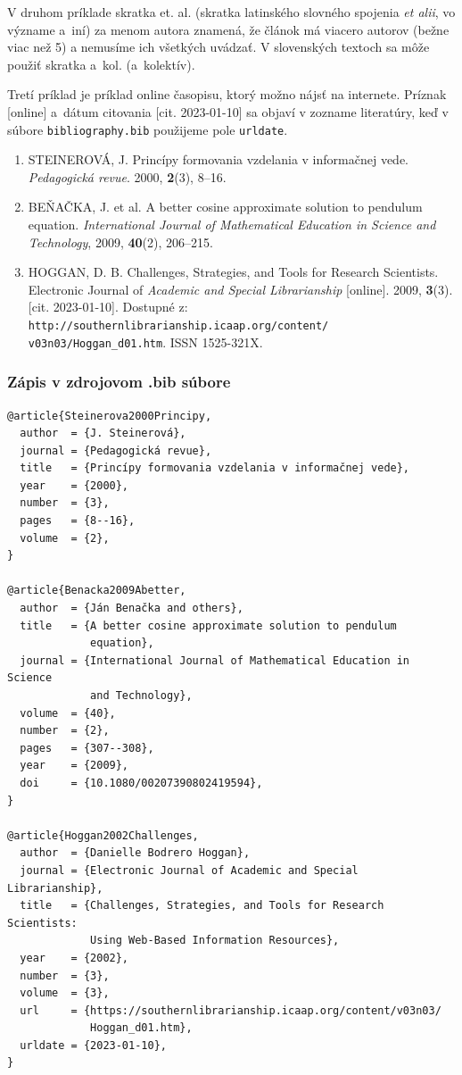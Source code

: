 \documentclass[../../../thesis.tex]{subfiles}
\begin{document}
V druhom príklade skratka et. al. (skratka latinského slovného spojenia \textit{et alii}, vo význame a~iní) za menom autora znamená, že článok má viacero autorov (bežne viac než 5) a nemusíme ich všetkých uvádzať.
V slovenských textoch sa môže použiť skratka a~kol. (a~kolektív).

Tretí príklad je príklad online časopisu, ktorý možno nájsť na internete. Príznak [online] a~dátum citovania [cit. 2023-01-10] sa objaví v zozname literatúry, keď v súbore \verb|bibliography.bib| použijeme pole \verb|urldate|.

\begin{enumerate}
\item STEINEROVÁ, J. Princípy formovania vzdelania v informačnej vede. \textit{Pedagogická revue}. 2000, \textbf{2}(3), 8–16.
\item BEŇAČKA, J. et al. A better cosine approximate solution to pendulum equation. \textit{International Journal of Mathematical Education in Science and Technology}, 2009, \textbf{40}(2), 206–215.
\item HOGGAN, D. B. Challenges, Strategies, and Tools for Research Scientists. Electronic Journal of \textit{Academic and Special Librarianship} [online]. 2009, \textbf{3}(3). [cit. 2023-01-10]. Dostupné z: \texttt{http://southernlibrarianship.icaap.org/content/ v03n03/Hoggan\_d01.htm}. ISSN 1525-321X.
\end{enumerate}

\subsubsection*{\normalsize Zápis v zdrojovom .bib súbore}
\begin{verbatim}
@article{Steinerova2000Principy,
  author  = {J. Steinerová},
  journal = {Pedagogická revue},
  title   = {Princípy formovania vzdelania v informačnej vede},
  year    = {2000},
  number  = {3},
  pages   = {8--16},
  volume  = {2},
}

@article{Benacka2009Abetter,
  author  = {Ján Benačka and others},
  title   = {A better cosine approximate solution to pendulum
             equation},
  journal = {International Journal of Mathematical Education in Science
             and Technology},
  volume  = {40},
  number  = {2},
  pages   = {307--308},
  year    = {2009},
  doi     = {10.1080/00207390802419594},
}

@article{Hoggan2002Challenges,
  author  = {Danielle Bodrero Hoggan},
  journal = {Electronic Journal of Academic and Special Librarianship},
  title   = {Challenges, Strategies, and Tools for Research Scientists:
             Using Web-Based Information Resources},
  year    = {2002},
  number  = {3},
  volume  = {3},
  url     = {https://southernlibrarianship.icaap.org/content/v03n03/
             Hoggan_d01.htm},
  urldate = {2023-01-10},
}
\end{verbatim}
\end{document}
